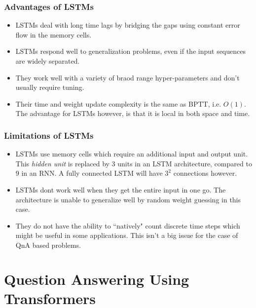 \documentclass[12pt]{report}
\begin{document}
            \subsubsection{Advantages of LSTMs}
                \begin{itemize}
                    \item LSTMs deal with long time lags by bridging the gaps using constant error flow in the memory cells.
                    \item LSTMs respond well to generalization problems, even if the input sequences are widely separated.
                    \item They work well with a variety of braod range hyper-parameters and don't usually require tuning.
                    \item Their time and weight update complexity is the same as BPTT, i.e. $ O(1) $. The advantage for LSTMs however, is that it is local in both space and time.
                \end{itemize}

            \subsubsection{Limitations of LSTMs}
                \begin{itemize}
                    \item LSTMs use memory cells which require an additional input and output unit. This \textit{hidden unit} is replaced by 3 units in an LSTM architecture, compared to 9 in an RNN. A fully connected LSTM will have $ 3^{2} $ connections however.
                    \item LSTMs dont work well when they get the entire input in one go. The architecture is unable to generalize well by random weight guessing in this case.
                    \item They do not have the ability to ``natively" count discrete time steps which might be useful in some applications. This isn't a big issue for the case of QnA based problems.
                \end{itemize}



            \cite{lstmhaighextractive}

            \cite{lstmhu2016question}

            \cite{lstmintent}

            \cite{fastQA}

	    \section{Question Answering Using Transformers}\label{23}
\end{document}
